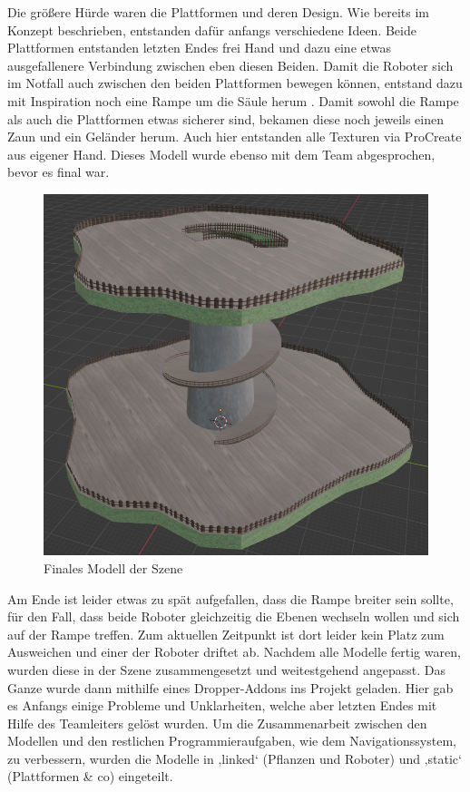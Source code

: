 \par
Die größere Hürde waren die Plattformen und deren Design. Wie bereits im Konzept beschrieben, entstanden dafür anfangs verschiedene Ideen. Beide Plattformen entstanden letzten Endes frei Hand und dazu eine etwas ausgefallenere Verbindung zwischen eben diesen Beiden. Damit die Roboter sich im Notfall auch zwischen den beiden Plattformen bewegen können, entstand dazu mit Inspiration noch eine Rampe um die Säule herum \cite{Spiral_Road}. Damit sowohl die Rampe als auch die Plattformen etwas sicherer sind, bekamen diese noch jeweils einen Zaun und ein Geländer herum. Auch hier entstanden alle Texturen via ProCreate aus eigener Hand. Dieses Modell wurde ebenso mit dem Team abgesprochen, bevor es final war.
\begin{figure}[H]
	\centering
	\includegraphics[height=0.3\pageheight,keepaspectratio]{pics/13}
	\caption{Finales Modell der Szene}
\end{figure}
\par
Am Ende ist leider etwas zu spät aufgefallen, dass die Rampe breiter sein sollte, für den Fall, dass beide Roboter gleichzeitig die Ebenen wechseln wollen und sich auf der Rampe treffen. Zum aktuellen Zeitpunkt ist dort leider kein Platz zum Ausweichen und einer der Roboter driftet ab.
Nachdem alle Modelle fertig waren, wurden diese in der Szene zusammengesetzt und weitestgehend angepasst. Das Ganze wurde dann mithilfe eines Dropper-Addons ins Projekt geladen. Hier gab es Anfangs einige Probleme und Unklarheiten, welche aber letzten Endes mit Hilfe des Teamleiters gelöst wurden. Um die Zusammenarbeit zwischen den Modellen und den restlichen Programmieraufgaben, wie dem Navigationssystem, zu verbessern, wurden die Modelle in ‚linked‘ (Pflanzen und Roboter) und ‚static‘ (Plattformen \& co) eingeteilt.
